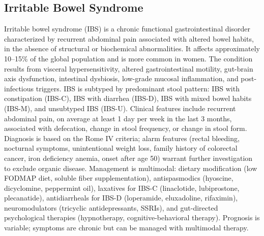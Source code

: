 






\label{sec:Functional Gastrointestinal Disorders}

\subsection{Irritable Bowel Syndrome}
\label{sec:Irritable Bowel Syndrome}
Irritable bowel syndrome (IBS) is a chronic functional gastrointestinal disorder characterized by recurrent abdominal pain associated with altered bowel habits, in the absence of structural or biochemical abnormalities. It affects approximately 10--15\% of the global population and is more common in women. The condition results from visceral hypersensitivity, altered gastrointestinal motility, gut-brain axis dysfunction, intestinal dysbiosis, low-grade mucosal inflammation, and post-infectious triggers. IBS is subtyped by predominant stool pattern: IBS with constipation (IBS-C), IBS with diarrhea (IBS-D), IBS with mixed bowel habits (IBS-M), and unsubtyped IBS (IBS-U). Clinical features include recurrent abdominal pain, on average at least 1 day per week in the last 3 months, associated with defecation, change in stool frequency, or change in stool form. Diagnosis is based on the Rome IV criteria; alarm features (rectal bleeding, nocturnal symptoms, unintentional weight loss, family history of colorectal cancer, iron deficiency anemia, onset after age 50) warrant further investigation to exclude organic disease. Management is multimodal: dietary modification (low FODMAP diet, soluble fiber supplementation), antispasmodics (hyoscine, dicyclomine, peppermint oil), laxatives for IBS-C (linaclotide, lubiprostone, plecanatide), antidiarrheals for IBS-D (loperamide, eluxadoline, rifaximin), neuromodulators (tricyclic antidepressants, SSRIs), and gut-directed psychological therapies (hypnotherapy, cognitive-behavioral therapy). Prognosis is variable; symptoms are chronic but can be managed with multimodal therapy.

